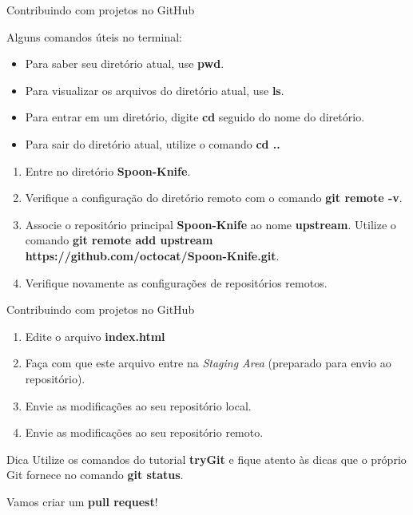 \documentclass[a4paper]{beamer}
\begin{document}
\begin{frame}{Contribuindo com projetos no GitHub}

Alguns comandos úteis no terminal:
\begin{itemize}
\item Para saber seu diretório atual, use \textbf{pwd}.
\item Para visualizar os arquivos do diretório atual, use \textbf{ls}.
\item Para entrar em um diretório, digite \textbf{cd} seguido do nome do diretório.
\item Para sair do diretório atual, utilize o comando \textbf{cd ..}
\end{itemize}

\pause
\vspace{5pt}
\begin{enumerate}
\item Entre no diretório \textbf{Spoon-Knife}.
\item Verifique a configuração do diretório remoto com o comando \textbf{git remote -v}.
\item Associe o repositório principal \textbf{Spoon-Knife} ao nome \textbf{upstream}. Utilize o comando \textbf{git remote add upstream https://github.com/octocat/Spoon-Knife.git}.
\item Verifique novamente as configurações de repositórios remotos.
\end{enumerate}

\end{frame}

\begin{frame}{Contribuindo com projetos no GitHub}

\begin{enumerate}
\item Edite o arquivo \textbf{index.html}
\item Faça com que este arquivo entre na \textit{Staging Area} (preparado para envio ao repositório).
\item Envie as modificações ao seu repositório local.
\item Envie as modificações ao seu repositório remoto.
\end{enumerate}

\begin{block}{Dica}
Utilize os comandos do tutorial \textbf{tryGit} e fique atento às dicas que o próprio Git fornece no comando \textbf{git status}.
\end{block}

\pause
\begin{center}
Vamos criar um \textbf{pull request}!
\end{center}

\end{frame}
\end{document}
